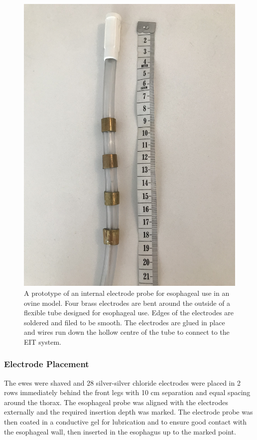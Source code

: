 \begin{figure}[H]
    \centering
	\includegraphics[width=\textwidth, angle =-90]{chapter7-internal_elec_motion/imgs/probe_prototype.jpg} 
	\caption[Probe prototype]{\label{fig:probe_design} 
	A prototype of an internal electrode probe for esophageal use in an ovine model.
	Four brass electrodes are bent around the outside of a flexible tube designed for
	esophageal use. Edges of the electrodes are soldered and filed to be smooth. 
	The electrodes are glued in place and wires run down the hollow centre
	of the tube to connect to the EIT system.}
 \end{figure}

\subsubsection{Electrode Placement}
The ewes were shaved and 28 silver-silver chloride electrodes were placed in 2 rows immediately behind the front
legs with 10 cm separation and equal spacing around the thorax. 
The esophageal probe was aligned with the electrodes externally and the required
insertion depth was marked. The electrode probe was then coated in a conductive gel for lubrication and to ensure good contact with the 
esophageal wall,
then inserted in the 
esophagus up to the marked point.

